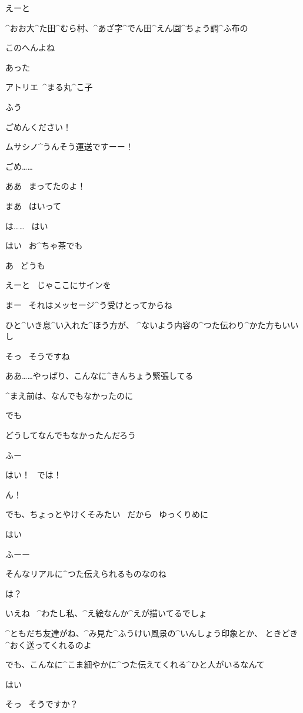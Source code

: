 \K えーと

\K ^{おお}{大}^{た}{田}^{むら}{村}、^{あざ}{字}^{でん}{田}^{えん}{園}^{ちょう}{調}^{ふ}{布}の

\K このへんよね

\page
\K あった

\Sign アトリエ\ ^{まる}{丸}^{こ}{子}

\K ふう

\page
\K ごめんください！

\K ムサシノ^{うんそう}{運送}ですーー！

\K ごめ……

\R ああ
\ まってたのよ！

\R まあ
\ はいって

\K は……
\ はい

\page
\R はい
\ お^{ちゃ}{茶}でも

\K あ
\ どうも

\K えーと
\ じゃここにサインを

\R まー
\ それはメッセージ^{う}{受}けとってからね

\R ひと^{いき}{息}^{い}{入}れた^{ほう}{方}が、
^{ないよう}{内容}の^{つた}{伝}わり^{かた}{方}もいいし

\K そっ
\ そうですね

\page
\K ああ……やっぱり、こんなに^{きんちょう}{緊張}してる

\K ^{まえ}{前}は、なんでもなかったのに

\K でも

\K どうしてなんでもなかったんだろう

\K ふー

\page
\K はい！
\ では！

\R ん！

\R でも、ちょっとやけくそみたい
\ だから
\ ゆっくりめに

\K はい

\page
\R ふーー

\R そんなリアルに^{つた}{伝}えられるものなのね

\K は？

\R いえね
\ ^{わたし}{私}、^{え}{絵}なんか^{えが}{描}いてるでしょ

\R ^{ともだち}{友達}がね、^{み}{見}た^{ふうけい}{風景}の^{いんしょう}{印象}とか、
ときどき^{おく}{送}ってくれるのよ

\page
\R でも、こんなに^{こま}{細}やかに^{つた}{伝}えてくれる^{ひと}{人}がいるなんて

\R はい

\K そっ
\ そうですか？

